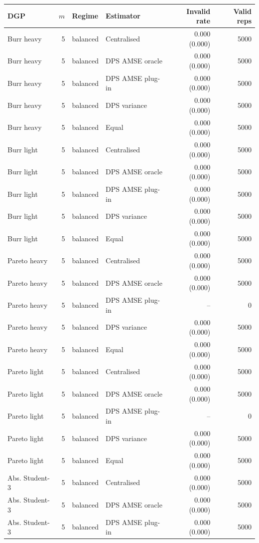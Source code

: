 \begin{tabular}{lrllrr}
\toprule
DGP & $m$ & Regime & Estimator & Invalid rate & Valid reps \\
\midrule
Burr heavy & 5 & balanced & Centralised & 0.000 (0.000) & 5000 \\
Burr heavy & 5 & balanced & DPS AMSE oracle & 0.000 (0.000) & 5000 \\
Burr heavy & 5 & balanced & DPS AMSE plug-in & 0.000 (0.000) & 5000 \\
Burr heavy & 5 & balanced & DPS variance & 0.000 (0.000) & 5000 \\
Burr heavy & 5 & balanced & Equal & 0.000 (0.000) & 5000 \\
Burr light & 5 & balanced & Centralised & 0.000 (0.000) & 5000 \\
Burr light & 5 & balanced & DPS AMSE oracle & 0.000 (0.000) & 5000 \\
Burr light & 5 & balanced & DPS AMSE plug-in & 0.000 (0.000) & 5000 \\
Burr light & 5 & balanced & DPS variance & 0.000 (0.000) & 5000 \\
Burr light & 5 & balanced & Equal & 0.000 (0.000) & 5000 \\
Pareto heavy & 5 & balanced & Centralised & 0.000 (0.000) & 5000 \\
Pareto heavy & 5 & balanced & DPS AMSE oracle & 0.000 (0.000) & 5000 \\
Pareto heavy & 5 & balanced & DPS AMSE plug-in & -- & 0 \\
Pareto heavy & 5 & balanced & DPS variance & 0.000 (0.000) & 5000 \\
Pareto heavy & 5 & balanced & Equal & 0.000 (0.000) & 5000 \\
Pareto light & 5 & balanced & Centralised & 0.000 (0.000) & 5000 \\
Pareto light & 5 & balanced & DPS AMSE oracle & 0.000 (0.000) & 5000 \\
Pareto light & 5 & balanced & DPS AMSE plug-in & -- & 0 \\
Pareto light & 5 & balanced & DPS variance & 0.000 (0.000) & 5000 \\
Pareto light & 5 & balanced & Equal & 0.000 (0.000) & 5000 \\
Abs. Student-3 & 5 & balanced & Centralised & 0.000 (0.000) & 5000 \\
Abs. Student-3 & 5 & balanced & DPS AMSE oracle & 0.000 (0.000) & 5000 \\
Abs. Student-3 & 5 & balanced & DPS AMSE plug-in & 0.000 (0.000) & 5000 \\

\end{tabular}
